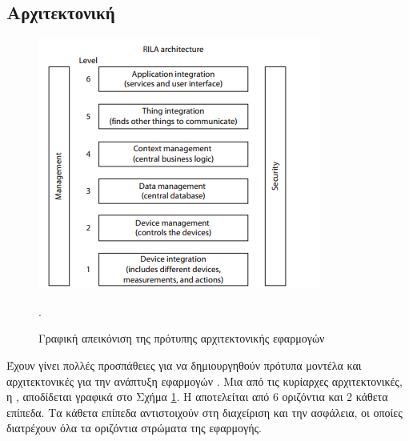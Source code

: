 \subsection{Αρχιτεκτονική}
\begin{figure}[h!]
\includegraphics[scale=1.5]{images/iotrm3.png}
\centering
\caption{Γραφική απεικόνιση της πρότυπης αρχιτεκτονικής  εφαρμογών \cite{iotrm}}.
\label{iotrm}
\end{figure}
Έχουν γίνει πολλές προσπάθειες για να δημιουργηθούν πρότυπα μοντέλα και αρχιτεκτονικές για την ανάπτυξη εφαρμογών .
Μια από τις κυρίαρχες αρχιτεκτονικές, η , αποδίδεται γραφικά στο Σχήμα \ref{iotrm}.
Η  αποτελείται από 6 οριζόντια και 2 κάθετα επίπεδα. Τα κάθετα επίπεδα αντιστοιχούν στη διαχείριση και την ασφάλεια, οι οποίες διατρέχουν όλα τα οριζόντια στρώματα της εφαρμογής.

